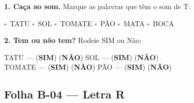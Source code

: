 \begin{somletra}[title={\faMusic~Atividade de Som da Letra --- B\^onus (n\~ao vale nota)}]
\textbf{1. Ca\c{c}a ao som.} Marque as palavras que t\^e{}m o som de T:
\begin{center}
$\square$~TATU \quad $\square$~SOL \quad $\square$~TOMATE \quad $\square$~P\~AO \quad $\square$~MATA \quad $\square$~BOCA
\end{center}

\textbf{2. Tem ou n\~ao{} tem?} Rodeie SIM ou N\~ao:
\begin{center}
TATU --- (\textbf{SIM}) (\textbf{N\~AO}) \quad SOL --- (\textbf{SIM}) (\textbf{N\~AO}) \\ TOMATE --- (\textbf{SIM}) (\textbf{N\~AO}) \quad P\~AO --- (\textbf{SIM}) (\textbf{N\~AO})
\end{center}
\end{somletra}



\subsection{Folha B-04 --- Letra R}

